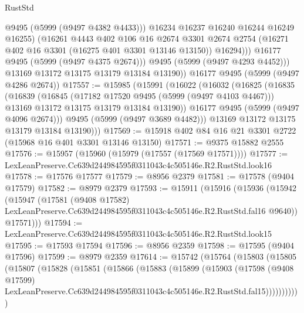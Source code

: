 \begin{lexlean}{RustStd}
\begin{coremodule}
                    @9495
                    (@5999 (@9497 @4382 @4433)))
                  @16234
                  @16237
                  @16240
                  @16244
                  @16249
                  @16255)
                (@16261
                  @4443
                  @402
                  @106
                  @16
                  @2674
                  @3301
                  @2674
                  @2754
                  (@16271 @402 @16 @3301 (@16275 @401 @3301 @13146 @13150))
                  @16294)))
            @16177
            @9495
            (@5999 (@9497 @4375 @2674)))
          @9495
          (@5999 (@9497 @4293 @4452)))
        @13169
        @13172
        @13175
        @13179
        @13184
        @13190))
    @16177
    @9495
    (@5999 (@9497 @4286 @2674))
@17557 := @15985
    (@15991
      (@16022
        (@16032
          (@16825
            (@16835
              (@16839
                (@16845
                  (@17182 @17520 @9495 (@5999 (@9497 @4103 @4467)))
                  @13169
                  @13172
                  @13175
                  @13179
                  @13184
                  @13190))
              @16177
              @9495
              (@5999 (@9497 @4096 @2674)))
            @9495
            (@5999 (@9497 @3689 @4482)))
          @13169
          @13172
          @13175
          @13179
          @13184
          @13190)))
@17569 := @15918 @402 @84 @16 @21 @3301 @2722 (@15968 @16 @401 @3301 @13146 @13150)
@17571 := @9375 @15882 @2555
@17576 := @15957 (@15960 (@15979 (@17557 (@17569 @17571))))
@17577 := LexLeanPreserve.Cc639d244984595f0311043c4c505146e.R2.RustStd.look16
@17578 := @17576 @17577
@17579 := @8956 @2379
@17581 := @17578 (@9404 @17579)
@17582 := @8979 @2379
@17593 := @15911
    (@15916
      (@15936
        (@15942
          (@15947
            (@17581
              (@9408 @17582)
              LexLeanPreserve.Cc639d244984595f0311043c4c505146e.R2.RustStd.fal16
              @9640))
          @17571)))
@17594 := LexLeanPreserve.Cc639d244984595f0311043c4c505146e.R2.RustStd.look15
@17595 := @17593 @17594
@17596 := @8956 @2359
@17598 := @17595 (@9404 @17596)
@17599 := @8979 @2359
@17614 := @15742
    (@15764
      (@15803
        (@15805
          (@15807
            (@15828
              (@15851
                (@15866
                  (@15883
                    (@15899
                      (@15903
                        (@17598
                          (@9408 @17599)
                          LexLeanPreserve.Cc639d244984595f0311043c4c505146e.R2.RustStd.fal15)))))))))))

\end{coremodule}
\end{lexlean}
